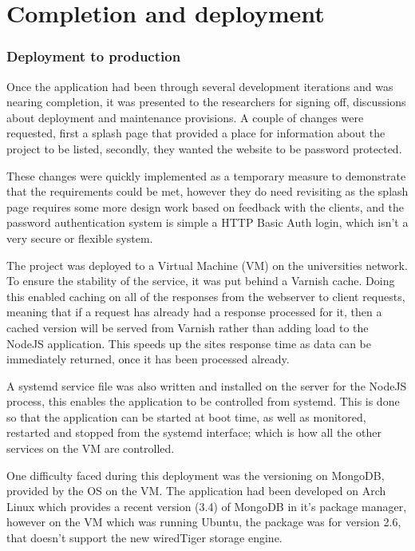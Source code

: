 \chapter{Completion and deployment}

\subsection{Deployment to production}
Once the application had been through several development iterations and was nearing completion, it was presented to the researchers for signing off, discussions about deployment and maintenance provisions. A couple of changes were requested, first a splash page that provided a place for information about the project to be listed, secondly, they wanted the website to be password protected. 

These changes were quickly implemented as a temporary measure to demonstrate that the requirements could be met, however they do need revisiting as the splash page requires some more design work based on feedback with the clients, and the password authentication system is simple a HTTP Basic Auth login, which isn't a very secure or flexible system. 

The project was deployed to a Virtual Machine (VM) on the universities network. To ensure the stability of the service, it was put behind a Varnish\cite{varnish} cache. Doing this enabled caching on all of the responses from the webserver to client requests, meaning that if a request has already had a response processed for it, then a cached version will be served from Varnish rather than adding load to the NodeJS application. This speeds up the sites response time as data can be immediately returned, once it has been processed already.

A systemd\cite{systemd} service file was also written and installed on the server for the NodeJS process, this enables the application to be controlled from systemd. This is done so that the application can be started at boot time, as well as monitored, restarted and stopped from the systemd interface; which is how all the other services on the VM are controlled.

One difficulty faced during this deployment was the versioning on MongoDB, provided by the OS on the VM. The application had been developed on Arch Linux which provides a recent version (3.4) of MongoDB in it's package manager, however on the VM which was running Ubuntu, the package was for version 2.6, that doesn't support the new wiredTiger\cite{tiger} storage engine. 

